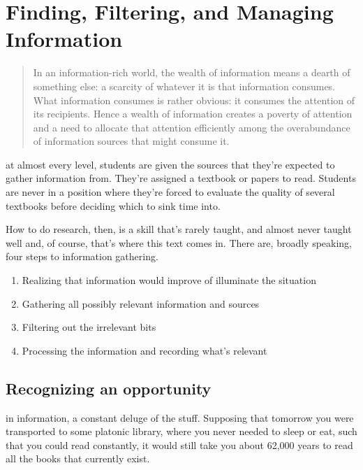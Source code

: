 \chapter{Finding, Filtering, and Managing Information}
\begin{quote}
  In an information-rich world, the wealth of information means a dearth of something else: a scarcity of whatever it is that information consumes. What information consumes is rather obvious: it consumes the attention of its recipients. Hence a wealth of information creates a poverty of attention and a need to allocate that attention efficiently among the overabundance of information sources that might consume it.
\end{quote}

 at almost every level, students are given the sources that they're expected to gather information from. They're assigned a textbook or papers to read. Students are never in a position where they're forced to evaluate the quality of several textbooks before deciding which to sink time into.

How to do research, then, is a skill that's rarely taught, and almost never taught well and, of course, that's where this text comes in. There are, broadly speaking, four steps to information gathering.

\begin{enumerate}
  \item Realizing that information would improve of illuminate the situation
  \item Gathering all possibly relevant information and sources
  \item Filtering out the irrelevant bits
  \item Processing the information and recording what's relevant
\end{enumerate}

\section{Recognizing an opportunity}

 in information, a constant deluge of the stuff. Supposing that tomorrow you were transported to some platonic library, where you never needed to sleep or eat, such that you could read constantly, it would still take you about 62,000 years to read all the books that currently exist. 

